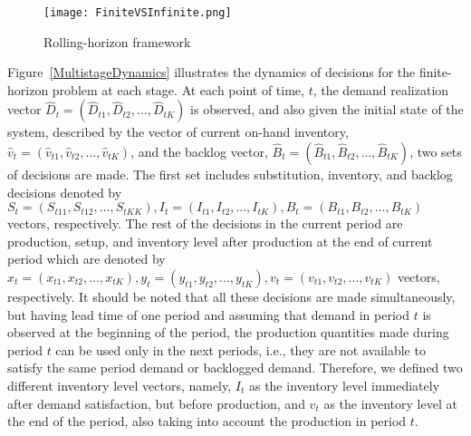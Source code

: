 \documentclass[10pt]{article}
\newcommand{\ti}{t} %
\newcommand{\Ka}{K}
\newcommand{\Bi}{B} %
\newcommand{\Vi}{v} %
\newcommand{\Es}{S} %
\newcommand{\InvPos}{inventory level after production }
\begin{document}
\begin{figure}[!h]
\begin{center}
\texttt{[image: FiniteVSInfinite.png]}
\caption{Rolling-horizon framework} 
\label{fig:FiniteVSInfinite}
\end{center}
\end{figure}




Figure~\ref{MultistageDynamics} illustrates the dynamics of decisions for the finite-horizon problem at each stage. 
At each point of time, $\ti$, the demand realization vector $\hat{D}_{\ti} =(\hat{D}_{\ti 1}, \hat{D}_{\ti 2},..., \hat{D}_{\ti \Ka})$ is observed, and also given the initial state of the system, described by the vector of current on-hand inventory, $\hat{\Vi}_{\ti} =(\hat{\Vi}_{\ti 1}, \hat{\Vi}_{\ti 2},..., \hat{\Vi}_{\ti \Ka})$, and the backlog vector, $\hat{\Bi}_{\ti}=(\hat{\Bi}_{\ti 1}, \hat{\Bi}_{\ti 2},..., \hat{\Bi}_{\ti \Ka})$, two sets of decisions are made.
The first set includes substitution, inventory, and backlog decisions denoted by ${\Es}_{\ti}= ({\Es}_{\ti 11}, {\Es}_{\ti 12},\hdots, {\Es}_{\ti \Ka \Ka}), I_{\ti} = ({I}_{\ti 1}, {I}_{\ti 2},..., {I}_{\ti \Ka}), {\Bi}_{\ti} =({\Bi}_{\ti 1}, {\Bi}_{\ti 2},\hdots, {\Bi}_{\ti \Ka})$ vectors, respectively. 
The rest of the decisions in the current period are production, setup, and \InvPos at the end of current period which are denoted by $x_{\ti} = (x_{\ti 1}, x_{\ti 2},..., x_{\ti \Ka}), y_{\ti} = ({y}_{\ti 1}, {y}_{\ti 2},..., {y}_{\ti \Ka}), \Vi_{\ti} = ({\Vi}_{\ti 1}, {\Vi}_{\ti 2},..., {\Vi}_{\ti \Ka})$ vectors, respectively. 
It should be noted that all these decisions are made simultaneously, but having lead time of one period and assuming that demand in period $\ti$ is observed at the beginning of the period, the production quantities made during period $\ti$ can be used only in the next periods, i.e., they are not available to satisfy the same period demand or backlogged demand. Therefore, we defined two different inventory level vectors, namely, $I_{\ti}$ as the inventory level immediately after demand satisfaction, but before production, and $\Vi_{\ti}$ as the inventory level at the end of the period, also taking into account the production in period $\ti$. 
\end{document}
